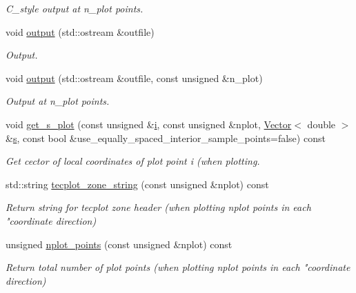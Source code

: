 \begin{DoxyCompactItemize}
\begin{DoxyCompactList}\small\item\em C\+\_\+style output at n\+\_\+plot points. \end{DoxyCompactList}\item 
void \hyperlink{classoomph_1_1QSpectralElement_3_012_00_01NNODE__1D_01_4_ab93d5c85d725fe3a0a8e875481847759}{output} (std\+::ostream \&outfile)
\begin{DoxyCompactList}\small\item\em Output. \end{DoxyCompactList}\item 
void \hyperlink{classoomph_1_1QSpectralElement_3_012_00_01NNODE__1D_01_4_aefe5742afd0ad13d39e78518144a941d}{output} (std\+::ostream \&outfile, const unsigned \&n\+\_\+plot)
\begin{DoxyCompactList}\small\item\em Output at n\+\_\+plot points. \end{DoxyCompactList}\item 
void \hyperlink{classoomph_1_1QSpectralElement_3_012_00_01NNODE__1D_01_4_a9495694ed222c8e9e41eee93734581d7}{get\+\_\+s\+\_\+plot} (const unsigned \&\hyperlink{cfortran_8h_adb50e893b86b3e55e751a42eab3cba82}{i}, const unsigned \&nplot, \hyperlink{classoomph_1_1Vector}{Vector}$<$ double $>$ \&\hyperlink{cfortran_8h_ab7123126e4885ef647dd9c6e3807a21c}{s}, const bool \&use\+\_\+equally\+\_\+spaced\+\_\+interior\+\_\+sample\+\_\+points=false) const
\begin{DoxyCompactList}\small\item\em Get cector of local coordinates of plot point i (when plotting. \end{DoxyCompactList}\item 
std\+::string \hyperlink{classoomph_1_1QSpectralElement_3_012_00_01NNODE__1D_01_4_a3abd839fcc323136429275aedd414765}{tecplot\+\_\+zone\+\_\+string} (const unsigned \&nplot) const
\begin{DoxyCompactList}\small\item\em Return string for tecplot zone header (when plotting nplot points in each "coordinate direction) \end{DoxyCompactList}\item 
unsigned \hyperlink{classoomph_1_1QSpectralElement_3_012_00_01NNODE__1D_01_4_ab722b0fd6c021708567af9c1d3de34be}{nplot\+\_\+points} (const unsigned \&nplot) const
\begin{DoxyCompactList}\small\item\em Return total number of plot points (when plotting nplot points in each "coordinate direction) \end{DoxyCompactList}\item 

\end{DoxyCompactItemize}
